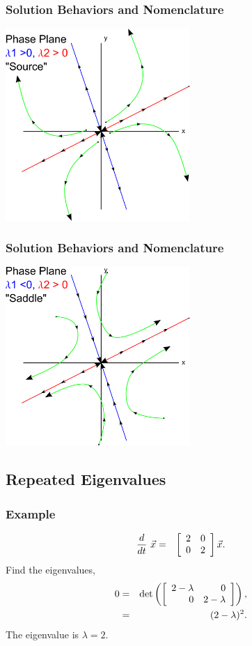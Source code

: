 \begin{frame}
  \frametitle{Solution Behaviors and Nomenclature}
    \includegraphics[width=7cm]{img/phasePlaneSource}
\end{frame}

\begin{frame}
  \frametitle{Solution Behaviors and Nomenclature}
    \includegraphics[width=7cm]{img/phasePlaneSaddle}
\end{frame}


\subsection{Repeated Eigenvalues}
\begin{frame}
  \frametitle{Example}
  \begin{eqnarray*}
    \deriv{~}{t} \vec{x} & = & \arrayTwo{2}{0}{0}{2} \vec{x}.
  \end{eqnarray*}
  {
    Find the eigenvalues,
    \begin{eqnarray*}
      0 & = & \det\lp\arrayTwo{2-\lambda}{0}{0}{2-\lambda}\rp, \\
      & = & (2-\lambda)^2.
    \end{eqnarray*}
    The eigenvalue is $\lambda=2$.
  }
\end{frame}

